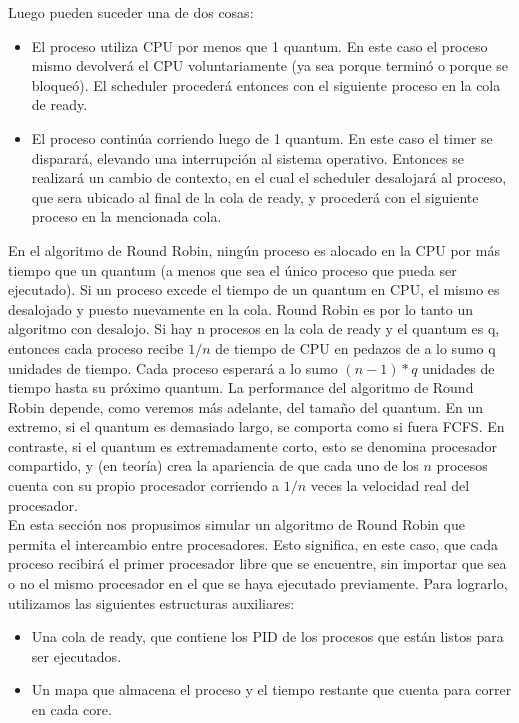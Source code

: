 Luego pueden suceder una de dos cosas: 
\begin{itemize}
	\item El proceso utiliza CPU por menos que 1 quantum. En este caso el proceso mismo devolverá el CPU voluntariamente (ya sea porque terminó o porque se bloqueó). El scheduler procederá entonces con el siguiente proceso en la cola de ready. 
	\item El proceso continúa corriendo luego de 1 quantum. En este caso el timer se disparará, elevando una interrupción al sistema operativo. Entonces se realizará un cambio de contexto, en el cual el scheduler desalojará al proceso, que sera ubicado al final de la cola de ready, y procederá con el siguiente proceso en la mencionada cola.   
\end{itemize} 

En el algoritmo de Round Robin, ningún proceso es alocado en la CPU por más tiempo que un quantum (a menos que sea el único proceso que pueda ser ejecutado). Si un proceso excede el tiempo de un quantum en CPU, el mismo es desalojado y puesto nuevamente en la cola. Round Robin es por lo tanto un algoritmo con desalojo.
Si hay n procesos en la cola de ready y el quantum es q, entonces cada proceso recibe $1/n$ de tiempo de CPU en pedazos de a lo sumo q unidades de tiempo. Cada proceso esperará a lo sumo $(n-1)*q$ unidades de tiempo hasta su próximo quantum.   
La performance del algoritmo de Round Robin depende, como veremos más adelante, del tamaño del quantum. En un extremo, si el quantum es demasiado largo, se comporta como si fuera FCFS. En contraste, si el quantum es extremadamente corto, esto se denomina procesador compartido, y (en teoría) crea la apariencia de que cada uno de los $n$ procesos cuenta con su propio procesador corriendo a $1/n$ veces la velocidad real del procesador. \\

En esta sección nos propusimos simular un algoritmo de Round Robin que permita el intercambio entre procesadores. Esto significa, en este caso, que cada proceso recibirá el primer procesador libre que se encuentre, sin importar que sea o no el mismo procesador en el que se haya ejecutado previamente.
Para lograrlo, utilizamos las siguientes estructuras auxiliares: 
\begin{itemize}
	\item Una cola de ready, que contiene los PID de los procesos que están listos para ser ejecutados.
	\item Un mapa que almacena el proceso y el tiempo restante que cuenta para correr en cada core.
\end{itemize} 

